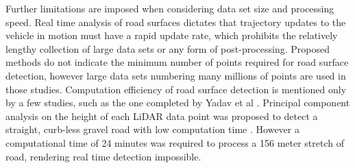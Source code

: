 \documentclass[balance,upint,subscriptcorrection,varvw,mathalfa=cal=boondoxo,colorlinks]{asmeconf}
\begin{document}
	{Further limitations are imposed when considering data set size and processing speed. Real time analysis of road surfaces dictates that trajectory updates to the vehicle in motion must have a rapid update rate, which prohibits the relatively lengthy collection of large data sets or any form of post-processing. Proposed methods \cite{yadav_extraction_2017,yadav_road_2018,yadav_rural_2018,yadav_pole-shaped_2015,miyazaki_line-based_2014,yang_semi-automated_2013,liu_new_2013,qiu_fast_2016} do not indicate the minimum number of points required for road surface detection, however large data sets numbering many millions of points are used in those studies. Computation efficiency of road surface detection is mentioned only by a few studies, such as the one completed by Yadav et al \cite{yadav_road_2018}. Principal component analysis on the height of each LiDAR data point was proposed to detect a straight, curb-less gravel road with low computation time \cite{yadav_road_2018}. However a computational time of 24 minutes was required to process a 156 meter stretch of road, rendering real time detection impossible.}
	
\end{document}
